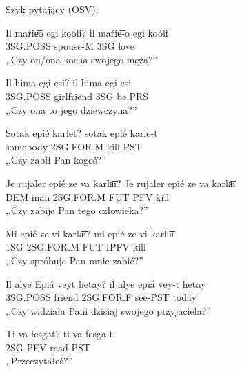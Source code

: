 \begin{spacing}{1.1}
Szyk pytający (OSV):


\begin{exe}
	\ex
	\trans Il maŕie͞o egi koóli?
	\gll il maŕie͞-o egi koóli\\
	  3SG.POSS spouse-M 3SG love\\
	\glt  ,,Czy on/ona kocha swojego męża?''
\end{exe}


\begin{exe}
	\ex
	\trans Il hima egi esi?
	\gll il hima egi esi\\
	  3SG.POSS girlfriend 3SG be.PRS\\
	\glt  ,,Czy ona to jego dziewczyna?''
\end{exe}

\begin{exe}
	\ex
	\trans Sotak epié karlet?
	\gll sotak epié karle-t\\
	  somebody 2SG.FOR.M kill-PST\\
	\glt  ,,Czy zabił Pan kogoś?''
\end{exe}

\begin{exe}
	\ex
	\trans Je rujaler epié ze va karla͞i?
	\gll Je rujaler epié ze va karla͞i\\
	  DEM man 2SG.FOR.M FUT PFV kill\\
	\glt  ,,Czy zabije Pan tego człowieka?''
\end{exe}

\begin{exe}
	\ex
	\trans Mi epié ze vi karla͞i?
	\gll mi epié ze vi karla͞i\\
	  1SG 2SG.FOR.M FUT IPFV kill\\
	\glt  ,,Czy spróbuje Pan mnie zabić?''
\end{exe}

\begin{exe}
	\ex
	\trans Il alye Epiá veyt hetay?
	\gll il alye epiá vey-t hetay\\
	  3SG.POSS friend 2SG.FOR.F see-PST today\\
	\glt  ,,Czy widziała Pani dzisiaj swojego przyjaciela?''
\end{exe}

\begin{exe}
	\ex
	\trans Ti va fesgat?
	\gll ti va fesga-t\\
	  2SG PFV read-PST\\
	\glt  ,,Przeczytałeś?''
\end{exe}


\end{spacing}
